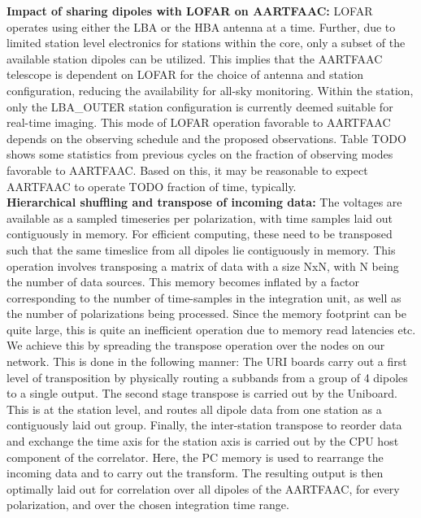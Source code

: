 \documentclass{ws-jai}
\begin{document}
\noindent  \textbf {Impact  of sharing  dipoles with  LOFAR on  AARTFAAC:} LOFAR
operates using  either the LBA  or the  HBA antenna at  a time. Further,  due to
limited station level electronics for stations within the core, only a subset of
the available  station dipoles can be  utilized. This implies that  the AARTFAAC
telescope  is  dependent  on  LOFAR  for  the  choice  of  antenna  and  station
configuration,  reducing the  availability  for all-sky  monitoring. Within  the
station, only the LBA\_OUTER station configuration is currently deemed suitable
for  real-time imaging.   This mode  of  LOFAR operation  favorable to  AARTFAAC
depends on  the observing  schedule and the  proposed observations.   Table TODO
shows some  statistics from previous cycles  on the fraction of  observing modes
favorable to AARTFAAC. Based on this, it  may be reasonable to expect AARTFAAC to
operate TODO fraction of time, typically.\\

\noindent \textbf {Hierarchical  shuffling and transpose of  incoming data:} The
voltages  are available  as a  sampled  timeseries per  polarization, with  time
samples laid out contiguously in memory.  For efficient computing, these need to
be transposed such that the same  timeslice from all dipoles lie contiguously in
memory. This  operation involves transposing a  matrix of data with  a size NxN,
with N  being the  number of data  sources.  This memory  becomes inflated  by a
factor corresponding  to the number of  time-samples in the integration  unit, as
well as the number of polarizations  being processed. Since the memory footprint
can be quite  large, this is quite  an inefficient operation due  to memory read
latencies etc.\\

We achieve this by spreading the transpose operation over the nodes
on our network. This is done in the following manner:
The URI boards carry out a first  level of transposition by physically routing a
subbands  from a  group  of 4  dipoles  to  a single  output.  The second  stage
transpose is  carried out  by the Uniboard.  This is at  the station  level, and
routes  all dipole  data from  one  station as  a contiguously  laid out  group.
Finally, the inter-station transpose to reorder  data and exchange the time axis
for  the  station  axis  is  carried  out by  the  CPU  host  component  of  the
correlator. Here, the  PC memory is used  to rearrange the incoming  data and to
carry out  the transform. The  resulting output is  then optimally laid  out for
correlation over all  dipoles of the AARTFAAC, for every  polarization, and over
the chosen integration time range.
\end{document}
